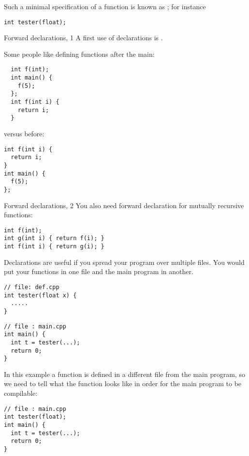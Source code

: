 Such a minimal specification of a function is known as
; for instance
\begin{lstlisting}
int tester(float);
\end{lstlisting}

\begin{block}{Forward declarations, 1}
  \label{sl:forward-proto1}
  A first use of declarations is .

  Some people like defining functions after the main:
\begin{multicols}{2}
\begin{lstlisting}
  int f(int);
  int main() {
    f(5);
  };
  int f(int i) {
    return i;
  }
\end{lstlisting}
\columnbreak
versus before:
\begin{lstlisting}
int f(int i) {
  return i;
}
int main() {
  f(5);
};
\end{lstlisting}
\end{multicols}
\end{block}

\begin{block}{Forward declarations, 2}
  \label{sl:forward-proto2}
  You also need forward declaration for mutually recursive functions:
\begin{lstlisting}
int f(int);
int g(int i) { return f(i); }
int f(int i) { return g(i); }
\end{lstlisting}
\end{block}

Declarations are useful if you spread your program over multiple
files. You would put your functions in one file
and the main program in another.

\begin{multicols}{2}  
\begin{lstlisting}
// file: def.cpp
int tester(float x) {
  .....
}
\end{lstlisting}
\vfill\columnbreak
\begin{lstlisting}
// file : main.cpp
int main() {
  int t = tester(...);
  return 0;
}
\end{lstlisting}
\end{multicols}

In this example a function 
is defined in a different file from the main program, so we need to
tell  what the function looks like in order for the main
program to be compilable:

\begin{lstlisting}
// file : main.cpp
int tester(float);
int main() {
  int t = tester(...);
  return 0;
}
\end{lstlisting}


